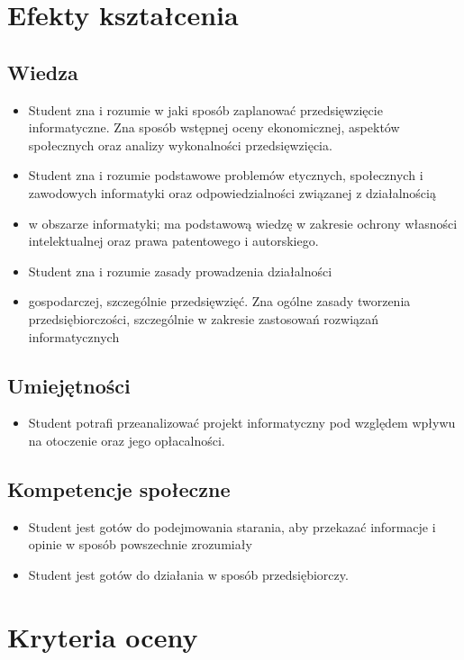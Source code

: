 \documentclass[12pt, a4paper]{article}
\begin{document}
\section{Efekty kształcenia}

\subsection*{Wiedza}
\begin{itemize}
  \item Student zna i rozumie w jaki sposób zaplanować przedsięwzięcie informatyczne. Zna sposób wstępnej oceny ekonomicznej, aspektów społecznych oraz analizy wykonalności przedsięwzięcia.
  \item Student zna i rozumie podstawowe problemów etycznych, społecznych i zawodowych informatyki oraz odpowiedzialności związanej z działalnością
  \item w obszarze informatyki; ma podstawową wiedzę w zakresie ochrony własności intelektualnej oraz prawa patentowego i autorskiego.
  \item Student zna i rozumie zasady prowadzenia działalności
  \item gospodarczej, szczególnie przedsięwzięć. Zna ogólne zasady tworzenia przedsiębiorczości, szczególnie w zakresie zastosowań rozwiązań informatycznych
\end{itemize}

\subsection*{Umiejętności}
\begin{itemize}
  \item Student potrafi przeanalizować projekt informatyczny pod względem wpływu na otoczenie oraz jego opłacalności.
\end{itemize}

\subsection*{Kompetencje społeczne}
\begin{itemize}
  \item Student jest gotów do podejmowania starania, aby przekazać informacje i opinie w sposób powszechnie zrozumiały
  \item Student jest gotów do działania w sposób przedsiębiorczy.
\end{itemize}

\section{Kryteria oceny}
\end{document}
